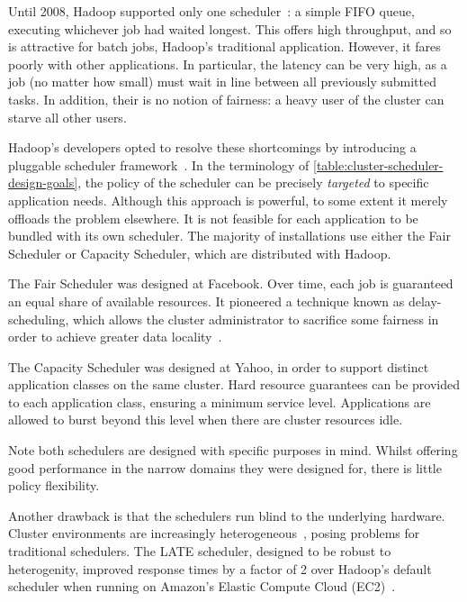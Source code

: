 Until 2008, Hadoop supported only one scheduler~\cite{HadoopFairSchedulerJIRA}: a simple FIFO queue, executing whichever job had waited longest. This offers high throughput, and so is attractive for batch jobs, Hadoop's traditional application. However, it fares poorly with other applications. In particular, the latency can be very high, as a job (no matter how small) must wait in line between all previously submitted tasks. In addition, their is no notion of fairness: a heavy user of the cluster can starve all other users.

Hadoop's developers opted to resolve these shortcomings by introducing a pluggable scheduler framework~\cite{HadoopSchedulingIBM}. In the terminology of \cref{table:cluster-scheduler-design-goals}, the policy of the scheduler can be precisely \emph{targeted} to specific application needs. Although this approach is powerful, to some extent it merely offloads the problem elsewhere. It is not feasible for each application to be bundled with its own scheduler\footnotemark.  The majority of installations use either the Fair Scheduler or Capacity Scheduler, which are distributed with Hadoop.

The Fair Scheduler was designed at Facebook. Over time, each job is guaranteed an equal share of available resources. It pioneered a technique known as delay-scheduling, which allows the cluster administrator to sacrifice some fairness in order to achieve greater data locality~\cite{Zaharia:2010}. 

The Capacity Scheduler was designed at Yahoo, in order to support distinct application classes on the same cluster. Hard resource guarantees can be provided to each application class, ensuring a minimum service level. Applications are allowed to burst beyond this level when there are cluster resources idle.

Note both schedulers are designed with specific purposes in mind. Whilst offering good performance in the narrow domains they were designed for, there is little policy flexibility.

Another drawback is that the schedulers run blind to the underlying hardware. Cluster environments are increasingly heterogeneous~\cite{Reiss:2012}, posing problems for traditional schedulers. The LATE scheduler, designed to be robust to heterogenity, improved response times by a factor of 2 over Hadoop's default scheduler when running on Amazon's Elastic Compute Cloud (EC2)~\cite{Zaharia:2008}.

